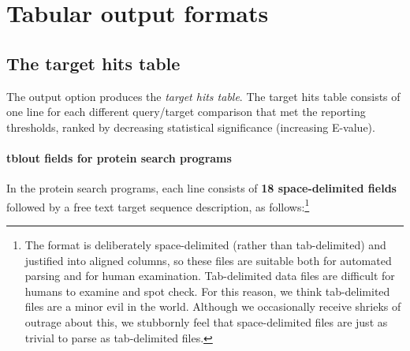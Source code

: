 \section{Tabular output formats}
\label{section:tabular}
\setcounter{footnote}{0}

\subsection{The target hits table}

The  output option produces the \emph{target hits
  table}.  The target hits table consists of one line for each
different query/target comparison that met the reporting thresholds,
ranked by decreasing statistical significance (increasing E-value).


\paragraph{tblout fields for protein search programs}

In the protein search programs, each line consists of \textbf{18
space-delimited fields} followed by a free text target sequence description, as
follows:\footnote{The  format is deliberately space-delimited
(rather than tab-delimited) and justified into aligned columns, so these files
  are suitable both for automated parsing and for human
  examination. Tab-delimited data files are difficult for humans to
  examine and spot check. For this reason, we think tab-delimited
  files are a minor evil in the world. Although we occasionally
  receive shrieks of outrage about this, we stubbornly feel that
  space-delimited files are just as trivial to parse as tab-delimited
  files.}

